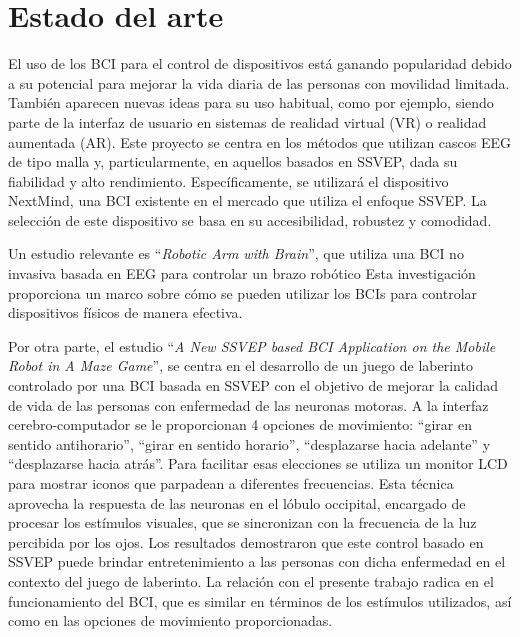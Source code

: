 \section{Estado del arte}

El uso de los BCI para el control de dispositivos está ganando popularidad debido a su potencial para mejorar la vida diaria de las personas con movilidad limitada. También aparecen nuevas ideas para su uso habitual, como por ejemplo, siendo parte de la interfaz de usuario en sistemas de realidad virtual (VR) o realidad aumentada (AR). Este proyecto se centra en los métodos que utilizan cascos EEG de tipo malla y, particularmente, en aquellos basados en SSVEP, dada su fiabilidad y alto rendimiento.
Específicamente, se utilizará el dispositivo NextMind, una BCI existente en el mercado que utiliza el enfoque SSVEP. La selección de este dispositivo se basa en su accesibilidad, robustez y comodidad.



Un estudio relevante es ``\textit{Robotic Arm with Brain}'', que utiliza una BCI no invasiva basada en EEG para controlar un brazo robótico \cite{RoboticArmWithBrain} Esta investigación proporciona un marco sobre cómo se pueden utilizar los BCIs para controlar dispositivos físicos de manera efectiva.



Por otra parte, el estudio ``\textit{A New SSVEP based BCI Application on the Mobile Robot in A Maze Game}'', se centra en el desarrollo de un juego de laberinto controlado por una BCI basada en SSVEP con el objetivo de mejorar la calidad de vida de las personas con enfermedad de las neuronas motoras. A la interfaz cerebro-computador se le proporcionan 4 opciones de movimiento:  ``girar en sentido antihorario'', ``girar en sentido horario'', ``desplazarse hacia adelante'' y ``desplazarse hacia atrás''. Para facilitar esas elecciones se utiliza un monitor LCD para mostrar iconos que parpadean a diferentes frecuencias. Esta técnica aprovecha la respuesta de las neuronas en el lóbulo occipital, encargado de procesar los estímulos visuales, que se sincronizan con la frecuencia de la luz percibida por los ojos. Los resultados demostraron que este control basado en SSVEP puede brindar entretenimiento a las personas con dicha enfermedad en el contexto del juego de laberinto.\cite{SSVEPBCIRobotMazeGame} La relación con el presente trabajo radica en el funcionamiento del BCI, que es similar en términos de los estímulos utilizados, así como en las opciones de movimiento proporcionadas.



